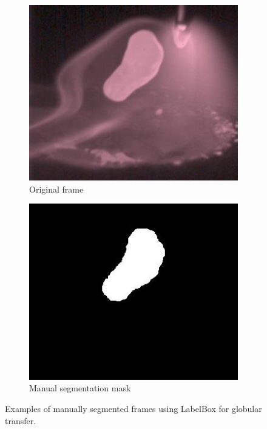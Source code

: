 \begin{figure}[htbp]
    \begin{subfigure}[b]{0.4\textwidth}
        \includegraphics[width=\linewidth]{Images/Dataset/globular_image.jpg}
        \caption{Original frame}
    \end{subfigure}
\hfill
    \begin{subfigure}[b]{0.4\textwidth}
        \includegraphics[width=\linewidth]{Images/Dataset/globular_mask.jpg}
        \caption{Manual segmentation mask}
    \end{subfigure}
    
    \caption[Examples of manually segmented frames for globular transfer]{Examples of manually segmented frames using LabelBox for globular transfer.}
    \label{fig:glob_sample_masks}
\end{figure}

